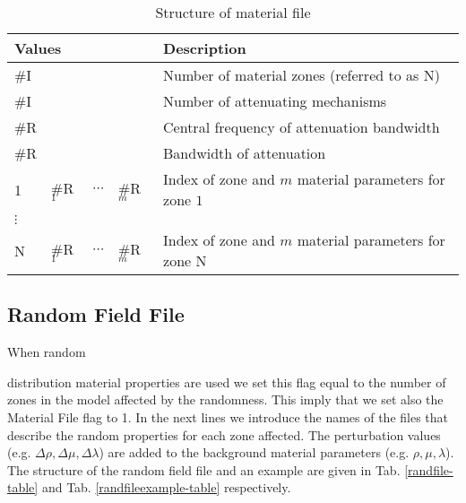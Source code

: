 \documentclass[12pt,twoside]{article}
\begin{document}
\begin{table}
\caption{Structure of material file}
\begin{center}
\begin{tabular}{lllll}
\hline
\multicolumn{4}{l}{Values}  &  Description          \\
\hline
\#I    & \multicolumn{3}{l}{ }          &  Number of material zones (referred to as N)             \\
{\color{gray}\#I  }  & \multicolumn{3}{l}{ }          &  {\color{gray}Number of attenuating mechanisms  }    \\
{\color{gray}\#R  }  & \multicolumn{3}{l}{ }          &  {\color{gray}Central frequency of attenuation  bandwidth } \\
{\color{gray}\#R  }  & \multicolumn{3}{l}{ }          &  {\color{gray}Bandwidth of attenuation }             \\
1    & \#R$_1$ & $\cdots$ & \#R$_m$ & Index of zone and $m$ material parameters for zone $1$\\
{\color{gray}$\vdots$ }& \multicolumn{4}{l}{ } \\
{\color{gray} N}    & {\color{gray}\#R$_1$} & {\color{gray}$\cdots$} & {\color{gray}\#R$_m$} & {\color{gray}Index of zone and $m$ material parameters for zone N}\\
\hline
\end{tabular}
\end{center}
\label{matfile-table}
\end{table}

\subsection{Random Field File}
\label{sec-ranfile}

\hypertarget{random_field}{When random} distribution material properties are used we set this flag equal to
the number of zones in the model affected by the randomness. This imply that we
set also the Material File flag to 1. In the next lines we introduce the names
of the files that describe the random properties for each zone affected. The
perturbation values (e.g. $\Delta\rho,\Delta\mu,\Delta\lambda$) are added to the
background material parameters (e.g. $\rho,\mu,\lambda$). The structure of the
random field file and an example are given in Tab. \ref{randfile-table} and Tab.
\ref{randfileexample-table} respectively.
\end{document}
